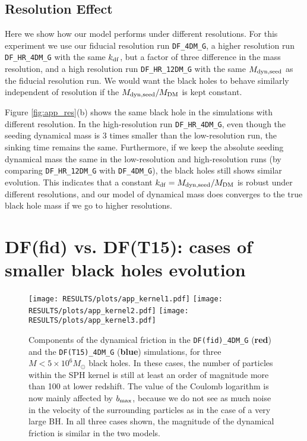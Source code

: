\subsection{Resolution Effect}

Here we show how our model performs under different resolutions. For this experiment we use our fiducial resolution run \texttt{DF\_4DM\_G}, a higher resolution run  \texttt{DF\_HR\_4DM\_G} with the same $k_{\rm df}$, but a factor of three difference in the mass resolution, and a high resolution run \texttt{DF\_HR\_12DM\_G} with the same $M_{\rm dyn,seed}$ as the fiducial resolution run. We would want the black holes to behave similarly independent of resolution if the $M_{\rm dyn,seed}/M_{\rm DM}$ is kept constant.

Figure \ref{fig:app_res}(b) shows the same black hole in the simulations with different resolution. In the high-resolution run \texttt{DF\_HR\_4DM\_G}, even though the seeding dynamical mass is 3 times smaller than the low-resolution run, the sinking time remains the same. Furthermore, if we keep the absolute seeding dynamical mass the same in the low-resolution and high-resolution runs (by comparing \texttt{DF\_HR\_12DM\_G} with \texttt{DF\_4DM\_G}), the black holes still shows similar evolution. This indicates that a constant $k_{\rm df}  = M_{\rm dyn,seed}/M_{\rm DM}$ is robust under different resolutions, and our model of dynamical mass does converges to the true black hole mass if we go to higher resolutions.





\section{DF(fid) vs. DF(T15): cases of smaller black holes evolution}
\label{app:df100}
\begin{figure*}
\texttt{[image: RESULTS/plots/app\_kernel1.pdf]}
\texttt{[image: RESULTS/plots/app\_kernel2.pdf]}
\texttt{[image: RESULTS/plots/app\_kernel3.pdf]}
\caption{Components of the dynamical friction in the \texttt{DF(fid)\_4DM\_G} (\textbf{red}) and the \texttt{DF(T15)\_4DM\_G} (\textbf{blue}) simulations, for three $M<5\times 10^6 M_\odot$ black holes. In these cases, the number of particles within the SPH kernel is still at least an order of magnitude more than 100 at lower redshift. The value of the Coulomb logarithm is now mainly affected by $b_{\rm max}$, because we do not see as much noise in the velocity of the surrounding particles as in the case of a very large BH. In all three cases shown, the magnitude of the dynamical friction is similar in the two models.}
\label{fig:app_kernel}
\end{figure*}

